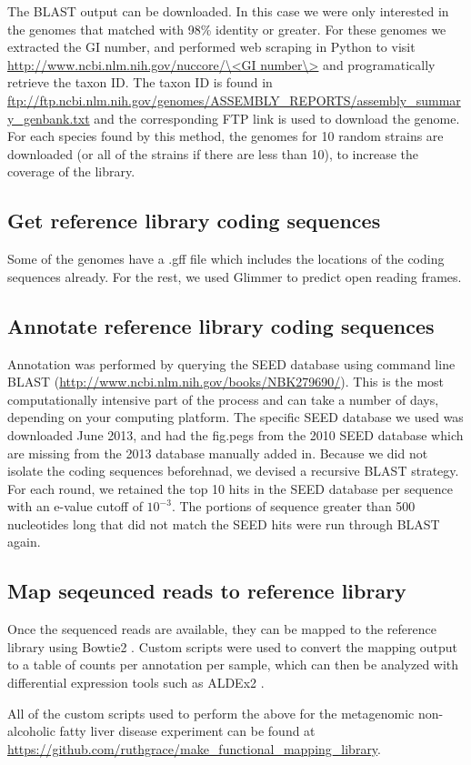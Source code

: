 The BLAST output can be downloaded. In this case we were only interested in the genomes that matched with 98\% identity or greater. For these genomes we extracted the GI number, and performed web scraping in Python to visit \url{http://www.ncbi.nlm.nih.gov/nuccore/\<GI number\>} and programatically retrieve the taxon ID. The taxon ID is found in \url{ftp://ftp.ncbi.nlm.nih.gov/genomes/ASSEMBLY_REPORTS/assembly_summary_genbank.txt} and the corresponding FTP link is used to download the genome. For each species found by this method, the genomes for 10 random strains are downloaded (or all of the strains if there are less than 10), to increase the coverage of the library.

\subsection{Get reference library coding sequences}
Some of the genomes have a .gff file which includes the locations of the coding sequences already. For the rest, we used Glimmer \cite{delcher2007identifying} to predict open reading frames.

\subsection{Annotate reference library coding sequences}
Annotation was performed by querying the SEED database \cite{overbeek2005subsystems} using command line BLAST (\url{http://www.ncbi.nlm.nih.gov/books/NBK279690/}). This is the most computationally intensive part of the process and can take a number of days, depending on your computing platform. The specific SEED database we used was downloaded June 2013, and had the fig.pegs from the 2010 SEED database which are missing from the 2013 database manually added in. Because we did not isolate the coding sequences beforehnad, we devised a recursive BLAST strategy. For each round, we retained the top 10 hits in the SEED database per sequence with an e-value cutoff of $10^{-3}$. The portions of sequence greater than 500 nucleotides long that did not match the SEED hits were run through BLAST again.

\subsection{Map seqeunced reads to reference library}
Once the sequenced reads are available, they can be mapped to the reference library using Bowtie2 \cite{langmead2012fast}. Custom scripts were used to convert the mapping output to a table of counts per annotation per sample, which can then be analyzed with differential expression tools such as ALDEx2 \cite{fernandes2014unifying}.

All of the custom scripts used to perform the above for the metagenomic non-alcoholic fatty liver disease experiment can be found at \url{https://github.com/ruthgrace/make_functional_mapping_library}.
